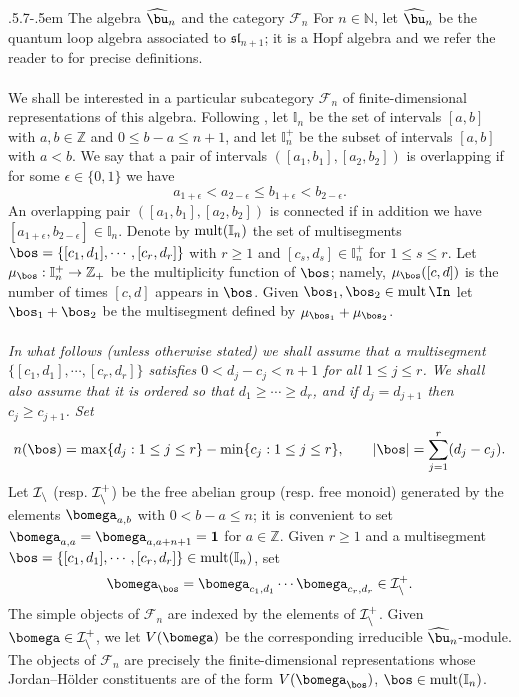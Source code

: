 \documentclass[11pt,reqno]{amsart}
\makeatletter
\theoremstyle{definition} \newtheorem*{defn}{Definition}
\theoremstyle{definition}
\numberwithin{equation}{section}
\newcommand{\lie}[1]{\mathfrak{#1}}
\def\subsection{\def\@secnumfont{\bfseries}\@startsection{subsection}{2}%
  {\parindent}{.5\linespacing\@plus.7\linespacing}{-.5em}%
  {\normalfont\bfseries}}
\def\mult{\operatorname{mult}}
\makeatother
\begin{document}
\subsection{The algebra $\widehat\bu_n$ and the category $\mathscr F_n$} \label{ms}For $n\in \mathbb N$, let $\widehat\bu_n$ be the quantum loop algebra associated to $\lie{sl}_{n+1}$; it is a Hopf algebra and we refer the reader to \cite{CP91,CP94} for precise definitions. \\\\
We shall be interested in a particular subcategory $\mathscr F_n$ of finite-dimensional representations of this algebra.
 Following \cite{BC25b}, let $\mathbb I_n$ be the set of intervals $[a,b]$ with $a,b\in\mathbb Z$ and $0\le b-a\le n+1$, and let $\mathbb I_n^+$ be the subset of intervals $[a,b]$ with $a<b$. We say that a pair of intervals $([a_1, b_1],[a_2,b_2])$ is overlapping  if for some $\epsilon\in\{0,1\}$ we have
 $$a_{1+\epsilon}<a_{2-\epsilon}\le b_{1+\epsilon}<b_{2-\epsilon}.$$ An overlapping pair $([a_1, b_1],[a_2,b_2])$ is connected if in addition we have  $[a_{1+\epsilon}, b_{2-\epsilon}]\in\mathbb I_n$.
 Denote by ${\rm mult}(\mathbb I_n)$ the set of multisegments $\bos=\{[c_1,d_1],\cdots, [c_r,d_r]\}$ with $r\ge 1$ and $[c_s, d_s]\in\mathbb I_n^+$ for $1\le s\le r$. Let $\mu_\bos:\mathbb I_n^+\to\mathbb Z_+$ be the multiplicity function of $\bos$; namely, $\mu_\bos([c,d])$ is the number of times $[c,d]$ appears in $\bos$. Given $\bos_1,\bos_2\in\mult\In$ let $\bos_1+\bos_2$ be the multisegment defined by $\mu_{\bos_1}+\mu_{\bos_2}$.\\\\
 {\em In what follows (unless otherwise stated) we shall assume that a multisegment $\{[c_1,d_1],\cdots, [c_r, d_r]\}$ satisfies $0<d_j-c_j<n+1$ for all $1\le j\le r$. We shall also assume
that it is ordered so that $d_1\ge\cdots\ge d_r$, and if $d_j=d_{j+1}$ then $c_j\ge c_{j+1}$. Set $$n(\bos)= \max\{d_j:1\le j\le r\}-\min\{c_j: 1\le j\le r\},\qquad |\bos|=\sum_{j=1}^r(d_j-c_j).$$}
  Let $\cal I_n$ (resp. $\cal I_n^+$) be the free abelian group (resp. free monoid) generated by the elements $\bomega_{a,b}$ with $0<b-a\le n$; it is convenient to set $\bomega_{a,a}=\bomega_{a,a+n+1}=\bold 1$ for $a\in\mathbb Z$.
 Given $r\ge 1$ and a multisegment $\bos= \{[c_1,d_1],\cdots,[c_r,d_r]\}\in{\rm mult}(\mathbb I_n)$, set $$\bomega_\bos=\bomega_{c_1,d_1}\cdots\bomega_{c_r,d_r}\in\cal I_n^+.$$ The simple objects of $\mathscr F_n$ are indexed by the elements of $\cal I_n^+$. Given $\bomega\in\cal I_n^+$, we let $V(\bomega)$ be the corresponding irreducible $\widehat\bu_n$-module. The objects of $\mathscr F_n$ are precisely the finite-dimensional representations whose Jordan--H\"older constituents are of the form $V(\bomega_\bos)$, $\bos\in{\rm mult}(\mathbb I_n)$.
\end{document}

